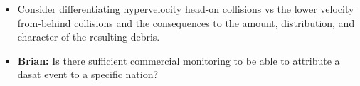 
\begin{itemize}

\item Consider differentiating hypervelocity head-on collisions vs the
  lower velocity from-behind collisions and the consequences to the
  amount, distribution, and character of the resulting debris.

\item {\bf Brian:} Is there sufficient commercial monitoring to be
  able to attribute a dasat event to a specific nation?
  
\end{itemize}
